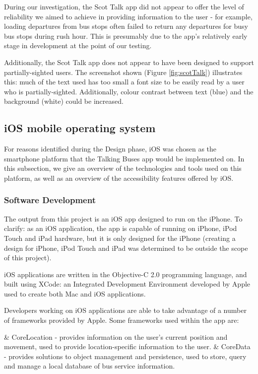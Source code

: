 \documentclass[10pt,twocolumn]{article}
\newcommand{\citep}[1]{}
\begin{document}
\begin{description}
During our investigation, the Scot Talk app did not appear to offer the level of reliability we aimed to achieve in providing information to the user - for example, loading departures from bus stops often failed to return any departures for busy bus stops during rush hour. This is presumably due to the app's relatively early stage in development at the point of our testing.

Additionally, the Scot Talk app does not appear to have been designed to support partially-sighted users. The screenshot shown (Figure \ref{fig:scotTalk}) illustrates this: much of the text used has too small a font size to be easily read by a user who is partially-sighted. Additionally, colour contrast between text (blue) and the background (white) could be increased.
\end{description}



\subsection{iOS mobile operating system}
For reasons identified during the Design phase, iOS was chosen as the smartphone platform that the Talking Buses app would be implemented on. In this subsection, we give an overview of the technologies and tools used on this platform, as well as an overview of the accessibility features offered by iOS.

\subsubsection{Software Development}
The output from this project is an iOS app designed to run on the iPhone. To clarify: as an iOS application, the app is capable of running on iPhone, iPod Touch and iPad hardware, but it is only designed for the iPhone (creating a design for iPhone, iPod Touch and iPad was determined to be outside the scope of this project).

iOS applications are written in the Objective-C 2.0 programming language, and built using XCode: an Integrated Development Environment developed by Apple used to create both Mac and iOS applications. 

Developers working on iOS applications are able to take advantage of a number of frameworks provided by Apple. Some frameworks used within the app are:
\begin{easylist}
& CoreLocation - provides information on the user's current position and movement, used to provide location-specific information to the user\citep{coreLocation}.
& CoreData - provides solutions to object management and persistence, used to store, query and manage a local database of bus service information\citep{coreData}.
\end{easylist}
\end{document}
